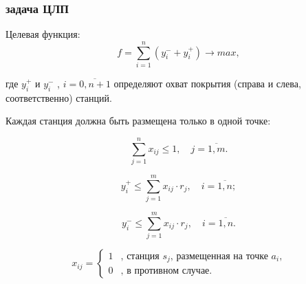 \begin{frame}
    \frametitle{задача ЦЛП}
    \begin{minipage}[t]{1\linewidth}
        \fontsize{8pt}{7.2}\selectfont
        Целевая функция:
        \begin{equation}
        f =  \sum\limits_{i=1}^n (y_i^- + y_i^+) \rightarrow max,
        \end{equation}

        где $y_i^+$ и $y_i^-$ , $i= \overline{0,n+1}$ определяют охват покрытия (справа и слева, соответственно) станций.
        \bigskip
    \end{minipage}

    \begin{minipage}[t]{0.5\linewidth} 
        \fontsize{8pt}{7.2}\selectfont
        Каждая станция должна быть размещена только в одной точке:
            
        \begin{equation}
        \label{eq:part3_xij}
        \sum\limits_{j=1}^n x_{ij} \leq 1, \quad j = \overline{1,m}. 
        \end{equation}
        
        
        
        \begin{equation}
        \label{eq:part3_yi_1}
        y_i^+ \leq \sum\limits_{j=1}^m x_{ij} \cdot r_j, \quad i = \overline{1,n};
        \end{equation}
        
        \begin{equation}
        \label{eq:part3_yi_2}
        y_i^- \leq \sum\limits_{j=1}^m x_{ij} \cdot r_j, \quad i = \overline{1,n}. 
        \end{equation}

        $$
            x_{ij} = 
             \begin{cases}
               1& \text{, станция $s_j$, размещенная на точке $a_i$,} \\
               0 & \text{, в противном случае.}
             \end{cases}
        $$

    \end{minipage}
    \hfill
    \begin{minipage}[t]{0.4\linewidth}
        
    \end{minipage}


\end{frame}

